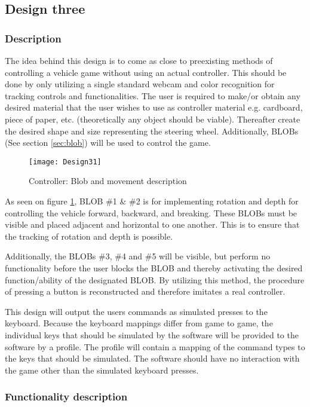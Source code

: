\subsection{Design three}
\label{design3}
\subsubsection*{Description}
The idea behind this design is to come as close to preexisting methods of controlling a vehicle game without using an actual controller. This should be done by only utilizing a single standard webcam and color recognition for tracking controls and functionalities. The user is required to make/or obtain any desired material that the user wishes to use as controller material e.g. cardboard, piece of paper, etc. (theoretically any object should be viable). Thereafter create the desired shape and size representing the steering wheel. 
Additionally, BLOBs (See section \ref{sec:blob}) will be used to control the game. 
\begin{figure}[h]
\centering
\texttt{[image: Design31]}
\caption{Controller: Blob and movement description}
\label{fig:design31}
\end{figure}

As seen on figure \ref{fig:design31}, BLOB \#1 \& \#2 is for implementing rotation and depth for controlling the vehicle forward, backward, and breaking. These BLOBs must be visible and placed adjacent and horizontal to one another. This is to ensure that the tracking of rotation and depth is possible.

Additionally, the BLOBs \#3, \#4 and \#5 will be visible, but perform no functionality before the user blocks the BLOB and thereby activating the desired function/ability of the designated BLOB. By utilizing this method, the procedure of pressing a button is reconstructed and therefore imitates a real controller.
\bigskip

This design will output the users commands as simulated presses to the keyboard. 
Because the keyboard mappings differ from game to game, the individual keys that should be simulated by the software will be provided to the software by a profile.
The profile will contain a mapping of the command types to the keys that should be simulated. 
The software should have no interaction with the game other than the simulated keyboard presses.

\subsubsection*{Functionality description} \label{Dfunc}

